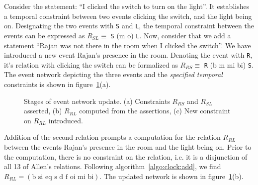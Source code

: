 \noindent
Consider the statement: ``I clicked the switch to turn on the light''. It establishes a temporal constraint between two events 
clicking the switch, and the light being on. Designating the two events with \texttt{S} and \texttt{L}, the temporal constraint
between the events can be expressed as $R_{SL} \equiv$ \texttt{S} (m o) \texttt{L}. 
Now, consider that we add a statement ``Rajan was not there in the room when I clicked the switch''. We have introduced a new event
Rajan's presence in the room. Denoting the event with \texttt{R}, it's relation with clicking the switch can be formalized as 
$R_{RS} \equiv$ \texttt{R} (b m mi bi) \texttt{S}. 
The event network depicting the three events and the {\it specified temporal} constraints is shown in 
figure~\ref{fig:clock:Allen-algebra-example}(a).

\begin{figure}[htbp!]
	\caption{Stages of event network update. (a) Constraints $R_{RS}$ and $R_{SL}$ asserted, (b) $R_{RL}$ computed
		from the assertions, (c) New constraint on $R_{RL}$ introduced.}
	\label{fig:clock:Allen-algebra-example}
\end{figure}

Addition of the second relation prompts a computation for the relation $R_{RL}$ between the events Rajan's presence in the room and 
the light being on. Prior to the computation, there is no constraint on the relation, i.e. it is a disjunction of all 13 of Allen's
relations. Following algorithm~\ref{algo:clock:add}, we find $R_{RL} = (\text{b si eq s d f oi mi bi})$. The updated network is shown 
in figure~\ref{fig:clock:Allen-algebra-example}(b). 


